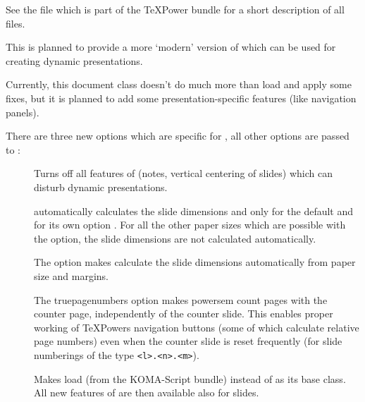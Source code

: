 \begin{slide}
See the file  which is part of the \TeX Power bundle for a short description of all files.

\newslide

This is planned to provide a more `modern' version of  which can be used for creating dynamic
presentations.

Currently, this document class doesn't do much more than load  and apply some fixes, but it is planned to
add some presentation-specific features (like navigation panels).

\newslide

There are three new options which are specific for , all other options are passed to :
\begin{description}
\item[]
  Turns off all features of  (notes, vertical centering of slides)
  which can disturb dynamic presentations.

\item[]
   automatically calculates the slide dimensions
   and  only for the default  and for its own option
  . For all the other paper sizes which are possible with the  option, the slide dimensions are not
  calculated automatically.

  The  option makes  calculate the slide dimensions automatically from paper size
  and margins.

\newslide

\item[]
  The truepagenumbers option makes powersem count pages with the counter page, independently of the counter slide. This
  enables proper working of TeXPowers navigation buttons (some of which calculate relative page numbers) even when the
  counter slide is reset frequently (for slide numberings of the type \verb|<l>.<n>.<m>|).

\item[] Makes
   load  (from the KOMA-Script bundle) instead of
   as its base class. All new features of  are then available also for slides.


\end{description}
\end{slide}
